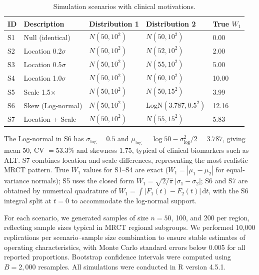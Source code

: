 \documentclass[AMA,Times1COL]{WileyNJDv5}
\begin{document}
\begin{table}[ht]
\centering
\caption{Simulation scenarios with clinical motivations.\label{tab:scenarios}}
\begin{tabular}{lllll}
\toprule
\textbf{ID} & \textbf{Description} & \textbf{Distribution 1} & \textbf{Distribution 2} & \textbf{True $W_1$} \\
\midrule
S1 & Null (identical) & $N(50, 10^2)$ & $N(50, 10^2)$ & 0.00 \\
S2 & Location 0.2$\sigma$ & $N(50, 10^2)$ & $N(52, 10^2)$ & 2.00 \\
S3 & Location 0.5$\sigma$ & $N(50, 10^2)$ & $N(55, 10^2)$ & 5.00 \\
S4 & Location 1.0$\sigma$ & $N(50, 10^2)$ & $N(60, 10^2)$ & 10.00 \\
S5 & Scale 1.5$\times$ & $N(50, 10^2)$ & $N(50, 15^2)$ & 3.99 \\
S6 & Skew (Log-normal) & $N(50, 10^2)$ & LogN$(3.787, 0.5^2)$ & 12.16 \\
S7 & Location + Scale & $N(50, 10^2)$ & $N(55, 15^2)$ & 5.83 \\
\bottomrule
\end{tabular}
\begin{tablenotes}
\item The Log-normal in S6 has $\sigma_{\log} = 0.5$ and $\mu_{\log} = \log 50 - \sigma_{\log}^2/2 = 3.787$, giving mean 50, CV $= 53.3\%$ and skewness $1.75$, typical of clinical biomarkers such as ALT. S7 combines location and scale differences, representing the most realistic MRCT pattern. True $W_1$ values for S1--S4 are exact ($W_1 = |\mu_1 - \mu_2|$ for equal-variance normals); S5 uses the closed form $W_1 = \sqrt{2/\pi}\,|\sigma_1 - \sigma_2|$; S6 and S7 are obtained by numerical quadrature of $W_1 = \int |F_1(t) - F_2(t)|\,\mathrm{d}t$, with the S6 integral split at $t = 0$ to accommodate the log-normal support.
\end{tablenotes}
\end{table}

For each scenario, we generated samples of size $n = 50$, 100, and 200 per region, reflecting sample sizes typical in MRCT regional subgroups. We performed 10{,}000 replications per scenario--sample size combination to ensure stable estimates of operating characteristics, with Monte Carlo standard errors below 0.005 for all reported proportions. Bootstrap confidence intervals were computed using $B = 2{,}000$ resamples. All simulations were conducted in R version 4.5.1.
\end{document}
